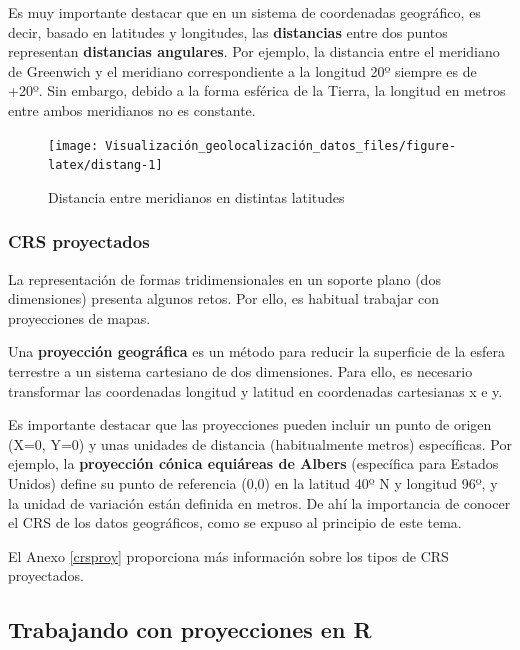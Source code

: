 \documentclass[
]{report}
\theoremstyle{definition}
\theoremstyle{definition}
\theoremstyle{definition}
\theoremstyle{definition}
\theoremstyle{remark}
\begin{document}
Es muy importante destacar que en un sistema de coordenadas geográfico, es
decir, basado en latitudes y longitudes, las \textbf{distancias} entre dos puntos
representan \textbf{distancias angulares}. Por ejemplo, la distancia entre el
meridiano de Greenwich y el meridiano correspondiente a la longitud 20º siempre
es de +20º. Sin embargo, debido a la forma esférica de la Tierra, la longitud en
metros entre ambos meridianos no es constante.

\begin{figure}

{\centering \texttt{[image: Visualización\_geolocalización\_datos\_files/figure-latex/distang-1]} 

}

\caption{Distancia entre meridianos en distintas latitudes}\label{fig:distang}
\end{figure}

\hypertarget{crs-proyectados}{%
\subsubsection{CRS proyectados}\label{crs-proyectados}}

La representación de formas tridimensionales en un soporte plano (dos
dimensiones) presenta algunos retos. Por ello, es habitual trabajar con
proyecciones de mapas.

Una \textbf{proyección geográfica} es un método para reducir la superficie de la
esfera terrestre a un sistema cartesiano de dos dimensiones. Para ello, es
necesario transformar las coordenadas longitud y latitud en coordenadas
cartesianas x e y.

Es importante destacar que las proyecciones pueden incluir un punto de origen
(X=0, Y=0) y unas unidades de distancia (habitualmente metros) específicas. Por
ejemplo, la \textbf{proyección cónica equiáreas de Albers} (específica para Estados
Unidos) define su punto de referencia (0,0) en la latitud 40º N y longitud 96º,
y la unidad de variación están definida en metros. De ahí la importancia de
conocer el CRS de los datos geográficos, como se expuso al principio de este
tema.

El Anexo \ref{crsproy} proporciona más información sobre los tipos de CRS
proyectados.

\hypertarget{trabajando-con-proyecciones-en-r}{%
\subsection{Trabajando con proyecciones en R}\label{trabajando-con-proyecciones-en-r}}
\end{document}
